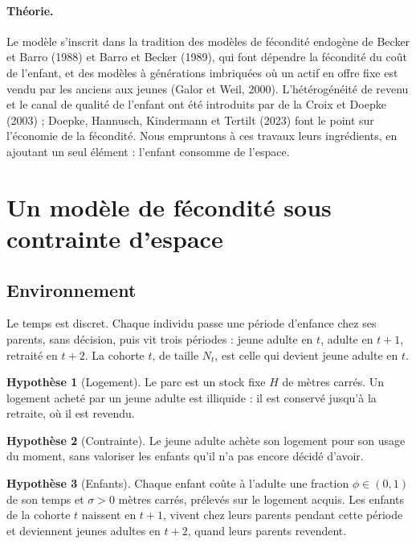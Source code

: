 \documentclass[11pt,a4paper]{article}
\theoremstyle{plain}
\theoremstyle{definition}
\newtheorem{hypothese}{Hypothèse}
\theoremstyle{remark}
\begin{document}
\paragraph{Théorie.} Le modèle s'inscrit dans la tradition des modèles de fécondité endogène de Becker et Barro (1988) et Barro et Becker (1989), qui font dépendre la fécondité du coût de l'enfant, et des modèles à générations imbriquées où un actif en offre fixe est vendu par les anciens aux jeunes (Galor et Weil, 2000). L'hétérogénéité de revenu et le canal de qualité de l'enfant ont été introduits par de la Croix et Doepke (2003) ; Doepke, Hannusch, Kindermann et Tertilt (2023) font le point sur l'économie de la fécondité. Nous empruntons à ces travaux leurs ingrédients, en ajoutant un seul élément : l'enfant consomme de l'espace.

\section{Un modèle de fécondité sous contrainte d'espace}\label{sec:modele}

\subsection{Environnement}

Le temps est discret. Chaque individu passe une période d'enfance chez ses parents, sans décision, puis vit trois périodes : jeune adulte en $t$, adulte en $t+1$, retraité en $t+2$. La cohorte $t$, de taille $N_t$, est celle qui devient jeune adulte en $t$.

\begin{hypothese}[Logement]\label{hyp:logement}
Le parc est un stock fixe $H$ de mètres carrés. Un logement acheté par un jeune adulte est illiquide : il est conservé jusqu'à la retraite, où il est revendu.
\end{hypothese}

\begin{hypothese}[Contrainte]\label{hyp:myopie}
Le jeune adulte achète son logement pour son usage du moment, sans valoriser les enfants qu'il n'a pas encore décidé d'avoir.
\end{hypothese}

\begin{hypothese}[Enfants]\label{hyp:enfants}
Chaque enfant coûte à l'adulte une fraction $\phi \in (0,1)$ de son temps et $\sigma > 0$ mètres carrés, prélevés sur le logement acquis. Les enfants de la cohorte $t$ naissent en $t+1$, vivent chez leurs parents pendant cette période et deviennent jeunes adultes en $t+2$, quand leurs parents revendent.
\end{hypothese}
\end{document}
